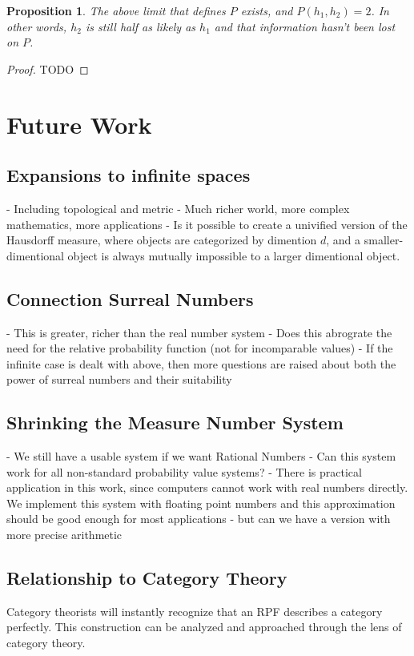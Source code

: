 \documentclass[twoside]{article}
\theoremstyle{plain}%
\newtheorem{proposition}[theorem]{Proposition}
\theoremstyle{definition}
\theoremstyle{remark}
\begin{document}
\begin{proposition}
The above limit that defines \(P\) exists, and \(P(h_1, h_2) = 2\). In other words, \(h_2\) is still half as likely as \(h_1\) and that information hasn't been lost on \(P\).
\end{proposition}

\begin{proof}
TODO
\end{proof}

\section{Future Work}
\subsection{Expansions to infinite spaces}
- Including topological and metric
- Much richer world, more complex mathematics, more applications
- Is it possible to create a univified version of the Hausdorff measure, where objects are categorized by dimention \(d\), and a smaller-dimentional object is always mutually impossible to a larger dimentional object.
\subsection{Connection Surreal Numbers}
- This is greater, richer than the real number system
- Does this abrograte the need for the relative probability function (not for incomparable values)
- If the infinite case is dealt with above, then more questions are raised about both the power of surreal numbers and their suitability
\subsection{Shrinking the Measure Number System}
- We still have a usable system if we want Rational Numbers
- Can this system work for all non-standard probability value systems?
- There is practical application in this work, since computers cannot work with real numbers directly. We implement this system with floating point numbers and this approximation should be good enough for most applications - but can we have a version with more precise arithmetic
\subsection{Relationship to Category Theory}

Category theorists will instantly recognize that an RPF describes a category perfectly. This construction can be analyzed and approached through the lens of category theory.
\end{document}
